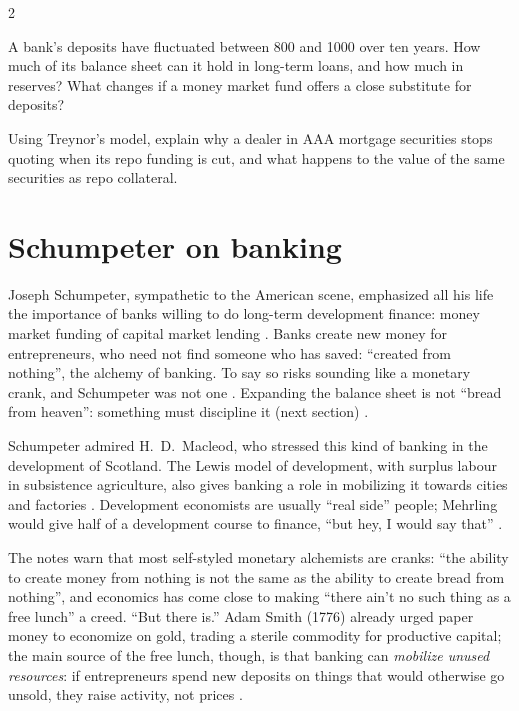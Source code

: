 \begin{paracol}{2}
\begin{exercise}
A bank's deposits have fluctuated between 800 and 1000 over ten years. How much of its balance sheet can it hold in long-term loans, and how much in reserves?
What changes if a money market fund offers a close substitute for deposits?
\end{exercise}

\begin{exercise}
Using Treynor's model, explain why a dealer in AAA mortgage securities stops quoting when its repo funding is cut, and what happens to the value of the same
securities as repo collateral.
\end{exercise}

\section{Schumpeter on banking}\label{sec:di-schumpeter}

Joseph Schumpeter, sympathetic to the American scene, emphasized all his life the importance of banks willing to do long-term development finance: money market
funding of capital market lending . Banks create new money for entrepreneurs, who need not find
someone who has saved: ``created from nothing'', the alchemy of banking. To say so risks sounding like a monetary crank, and Schumpeter was not one
. Expanding the balance sheet is not ``bread from heaven'': something must discipline it (next section) .

Schumpeter admired H.~D.~Macleod, who stressed this kind of banking in the development of Scotland. The Lewis model of development, with surplus labour in
subsistence agriculture, also gives banking a role in mobilizing it towards cities and factories .
Development economists are usually ``real side'' people; Mehrling would give half of a development course to finance, ``but hey, I would say that''
.

\begin{intuition}
The notes warn that most self-styled monetary alchemists are cranks: ``the ability to create money from nothing is not the same as the ability to create bread from nothing'', and economics has
come close to making ``there ain't no such thing as a free lunch'' a creed. ``But there is.'' Adam Smith (1776) already urged paper money to economize on gold, trading a sterile commodity for
productive capital; the main source of the free lunch, though, is that banking can \emph{mobilize unused resources}: if entrepreneurs spend new deposits on things that would otherwise go unsold,
they raise activity, not prices .
\end{intuition}


\end{paracol}
